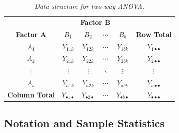 \documentclass[twoside]{book}
\begin{document}
\begin{table}[H]
\centering
\begin{tabular}{c|c c c c|c}
\toprule
& \multicolumn{4}{c|}{\textbf{Factor B}} & \\
\cline{2-5}
\textbf{Factor A} & $B_1$ & $B_2$ & $\cdots$ & $B_b$ & \textbf{Row Total} \\
\midrule
$A_1$ & $Y_{11k}$ & $Y_{12k}$ & $\cdots$ & $Y_{1bk}$ & $Y_{1\bullet\bullet}$ \\
$A_2$ & $Y_{21k}$ & $Y_{22k}$ & $\cdots$ & $Y_{2bk}$ & $Y_{2\bullet\bullet}$ \\
$\vdots$ & $\vdots$ & $\vdots$ & $\ddots$ & $\vdots$ & $\vdots$ \\
$A_a$ & $Y_{a1k}$ & $Y_{a2k}$ & $\cdots$ & $Y_{abk}$ & $Y_{a\bullet\bullet}$ \\
\midrule
\textbf{Column Total} & $Y_{\bullet1\bullet}$ & $Y_{\bullet2\bullet}$ & $\cdots$ & $Y_{\bullet b\bullet}$ & $Y_{\bullet\bullet\bullet}$ \\
\bottomrule
\end{tabular}
\caption{\textit{Data structure for two-way ANOVA.}}
\label{tab:two-way-data}
\end{table}

\subsection{Notation and Sample Statistics}
\end{document}
